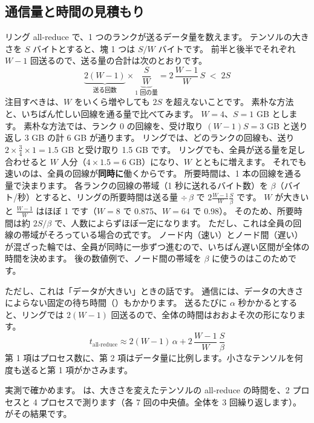 \subsection*{通信量と時間の見積もり}

リング all-reduce で、1 つのランクが送るデータ量を数えます。
テンソルの大きさを $S$ バイトとすると、塊 1 つは $S/W$ バイトです。
前半と後半でそれぞれ $W-1$ 回送るので、送る量の合計は次のとおりです。
\begin{equation}
\underbrace{2(W-1)}_{\text{送る回数}}\times\underbrace{\frac{S}{W}}_{\text{1 回の量}}
=2\,\frac{W-1}{W}\,S\;<\;2S
\label{eq:dist-ring-bytes}
\end{equation}
注目すべきは、$W$ をいくら増やしても $2S$ を超えないことです。
素朴な方法と、いちばん忙しい回線を通る量で比べてみます。
$W=4$、$S=1$ GB とします。
素朴な方法では、ランク 0 の回線を、受け取り $(W-1)S=3$ GB と送り返し 3 GB の計 6 GB が通ります。
リングでは、どのランクの回線も、送り $2\times\frac{3}{4}\times1=1.5$ GB と受け取り 1.5 GB です。
リングでも、全員が送る量を足し合わせると $W$ 人分（$4\times1.5=6$ GB）になり、$W$ とともに増えます。
それでも速いのは、全員の回線が\textbf{同時に}働くからです。
所要時間は、1 本の回線を通る量で決まります。
各ランクの回線の帯域（1 秒に送れるバイト数）を $\beta$（バイト/秒）とすると、リングの所要時間は送る量 $\div\,\beta$ で $2\frac{W-1}{W}\frac{S}{\beta}$ です。
$W$ が大きいと $\frac{W-1}{W}$ はほぼ 1 です（$W=8$ で 0.875、$W=64$ で 0.98）。
そのため、所要時間は約 $2S/\beta$ で、人数によらずほぼ一定になります。
ただし、これは全員の回線の帯域がそろっている場合の式です。
ノード内（速い）とノード間（遅い）が混ざった輪では、全員が同時に一歩ずつ進むので、いちばん遅い区間が全体の時間を決めます。
後の数値例で、ノード間の帯域を $\beta$ に使うのはこのためです。

ただし、これは「データが大きい」ときの話です。
通信には、データの大きさによらない固定の待ち時間（）もかかります。
送るたびに $\alpha$ 秒かかるとすると、リングでは $2(W-1)$ 回送るので、全体の時間はおおよそ次の形になります。
\begin{equation}
t_{\text{all-reduce}}\approx 2(W-1)\,\alpha+2\,\frac{W-1}{W}\,\frac{S}{\beta}
\label{eq:dist-alpha-beta}
\end{equation}
第 1 項はプロセス数に、第 2 項はデータ量に比例します。小さなテンソルを何度も送ると第 1 項がかさみます。

実測で確かめます。
 は、大きさを変えたテンソルの all-reduce の時間を、2 プロセスと 4 プロセスで測ります（各 7 回の中央値。全体を 3 回繰り返します）。
がその結果です。

